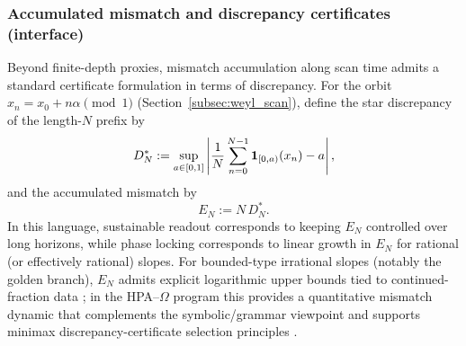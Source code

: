 \subsubsection{Accumulated mismatch and discrepancy certificates (interface)}
\label{subsubsec:discrepancy_certificates}

Beyond finite-depth proxies, mismatch accumulation along scan time admits a standard certificate formulation in terms of discrepancy.
For the orbit $x_n=x_0+n\alpha\pmod 1$ (Section~\ref{subsec:weyl_scan}), define the star discrepancy of the length-$N$ prefix by \cite{KuipersNiederreiter1974}
\begin{equation}
\label{eq:star_discrepancy_def}
D_N^\ast
:=
\sup_{a\in[0,1]}
\left|
\frac{1}{N}\sum_{n=0}^{N-1}\mathbf{1}_{[0,a)}(x_n) - a
\right|,
\end{equation}
and the accumulated mismatch by
\begin{equation}
\label{eq:accumulated_mismatch_def}
E_N := N\,D_N^\ast.
\end{equation}
In this language, sustainable readout corresponds to keeping $E_N$ controlled over long horizons, while phase locking corresponds to linear growth in $E_N$ for rational (or effectively rational) slopes.
For bounded-type irrational slopes (notably the golden branch), $E_N$ admits explicit logarithmic upper bounds tied to continued-fraction data \cite{Cassels1957,KuipersNiederreiter1974}; in the HPA--$\Omega$ program this provides a quantitative mismatch dynamic that complements the symbolic/grammar viewpoint and supports minimax discrepancy-certificate selection principles \cite{Ma2025HPT,Ma2025CAP}.
